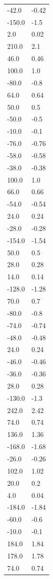 \begin{longtable}{ll}
-42.0 & -0.42 \\
-150.0 & -1.5 \\
2.0 & 0.02 \\
210.0 & 2.1 \\
46.0 & 0.46 \\
100.0 & 1.0 \\
-80.0 & -0.8 \\
64.0 & 0.64 \\
50.0 & 0.5 \\
-50.0 & -0.5 \\
-10.0 & -0.1 \\
-76.0 & -0.76 \\
-58.0 & -0.58 \\
-38.0 & -0.38 \\
100.0 & 1.0 \\
66.0 & 0.66 \\
-54.0 & -0.54 \\
24.0 & 0.24 \\
-28.0 & -0.28 \\
-154.0 & -1.54 \\
50.0 & 0.5 \\
28.0 & 0.28 \\
14.0 & 0.14 \\
-128.0 & -1.28 \\
70.0 & 0.7 \\
-80.0 & -0.8 \\
-74.0 & -0.74 \\
-48.0 & -0.48 \\
24.0 & 0.24 \\
-46.0 & -0.46 \\
-36.0 & -0.36 \\
28.0 & 0.28 \\
-130.0 & -1.3 \\
242.0 & 2.42 \\
74.0 & 0.74 \\
136.0 & 1.36 \\
-168.0 & -1.68 \\
-26.0 & -0.26 \\
102.0 & 1.02 \\
20.0 & 0.2 \\
4.0 & 0.04 \\
-184.0 & -1.84 \\
-60.0 & -0.6 \\
-10.0 & -0.1 \\
184.0 & 1.84 \\
178.0 & 1.78 \\
74.0 & 0.74 \\

\end{longtable}
